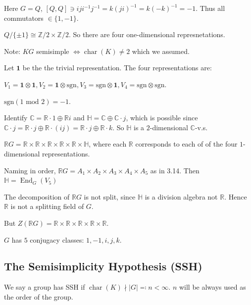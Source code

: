 \documentclass{article}
\theoremstyle{definition}
\theoremstyle{plain}
\theoremstyle{remark}
\begin{document}
    Here \(G=Q\), \([Q,Q] \ni ij i ^{-1} j ^{-1} = k (ji) ^{-1} = k(-k)^{-1}=-1\). Thus all commutators \(\in \{ 1, -1 \}\).
    
    \(Q / \{ \pm 1 \} \cong \mathbb{Z} / 2 \times \mathbb{Z} / 2\). So there are four one-dimensional represnetations.

    Note: \(KG\) semisimple \(\iff \operatorname{char}(K) \neq 2\) which we assumed.

    Let \(\mathbf{1}\) be the the trivial representation. The four representations are:
    
    \(V_1 = \mathbf{1} \otimes \mathbf{1}, V_2 =  \mathbf{1} \otimes \text{sgn}, V_3 = \text{sgn} \otimes \mathbf{1}, V_4 = \text{sgn} \otimes \text{sgn}\).

    \(\text{sgn}(1 \text{ mod } 2) = -1\).
    
    Identify \(\mathbb{C} = \mathbb{R} \cdot 1 \oplus \mathbb{R} i\) and \(\mathbb{H} = \mathbb{C} \oplus \mathbb{C} \cdot j\), which is possible since \(\mathbb{C} \cdot j = \mathbb{R} \cdot j \oplus \mathbb{R} \cdot (ij) = \mathbb{R} \cdot j \oplus \mathbb{R} \cdot k\). So \(\mathbb{H}\) is a \(2\)-dimensional \(\mathbb{C}\)-v.s.
    
    \(\mathbb{R} G = \mathbb{R} \times \mathbb{R} \times \mathbb{R} \times \mathbb{R} \times \mathbb{R} \times \mathbb{H}\), where each \(\mathbb{R}\) corresponds to each of of the four \(1\)-dimensional representations.

    Naming in order, \(\mathbb{R} G = A_1 \times A_2 \times A_3 \times A_4 \times A_5\) as in 3.14. Then \(\mathbb{H} = \operatorname{End}_G(V_5)\)

    The decomposition of \(\mathbb{R} G\) is not split, since \(\mathbb{H}\) is a division algebra not \(\mathbb{R}\). Hence \(\mathbb{R}\) is not a splitting field of \(G\).

    But \(Z(\mathbb{R} G) = \mathbb{R} \times \mathbb{R} \times \mathbb{R} \times \mathbb{R} \times \mathbb{R}\).

    \(G\) has \(5\) conjugacy classes: \(1, -1, i,j,k\).

    \subsection*{The Semisimplicity Hypothesis (SSH)}

    We say a group has SSH if \(\operatorname{char}(K) \nmid \vert G \vert \eqqcolon n < \infty\). \(n\) will be always used as the order of the group.
\end{document}
